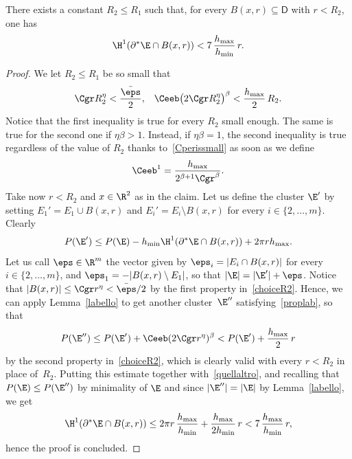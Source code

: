 \begin{lem}\label{13/2}
There exists a constant $R_2\leq R_1$ such that, for every $B(x,r)\subseteq \mathsf{D}$ with $r<R_2$, one has
\begin{equation}\label{step1}
\H^1(\partial^* \E\cap B(x,r)) < 7\,\frac{h_{\max}}{h_{\min}} \, r.
\end{equation}
\end{lem}
\begin{proof}
We let $R_2\leq R_1$ be so small that
\begin{align}\label{choiceR2}
\Cgr R_2^\eta <\frac{\bar\eps} 2, &&
\Ceeb \big( 2 \Cgr R_2^\eta\big)^\beta < \frac{h_{\max}}2\,R_2.
\end{align}
Notice that the first inequality is true for every $R_2$ small enough. The same is true for the second one if $\eta\beta>1$. Instead, if $\eta\beta=1$, the second inequality is true regardless of the value of $R_2$ thanks to~\eqref{Cperissmall} as soon as we define
\begin{equation}\label{ceeb1}
\Ceeb^1 =\frac{h_{\max}}{2^{\beta+1}\Cgr^\beta} .
\end{equation}
Take now $r<R_2$ and $x\in\R^2$ as in the claim. Let us define the cluster $\E'$ by setting $E_1'=E_1\cup B(x,r)$ and $E_i'=E_i\setminus B(x,r)$ for every $i\in\{2,\dots,m\}$. Clearly
\begin{equation}\label{quellaltro}
P(\E')\leq P(\E) - h_{\min} \H^1(\partial^* \E \cap B(x,r)) + 2\pi r h_{\max}.
\end{equation}
Let us call $\eps\in\R^m$ the vector given by $\eps_i=|E_i\cap B(x,r)|$ for every $i\in\{2,\dots,m\}$, and $\eps_1=-|B(x,r)\setminus E_1|$, so that $|\E|=|\E'|+\eps$. Notice that $|B(x,r)|\leq \Cgr r^\eta<\bar\eps/2$ by the first property in~\eqref{choiceR2}. Hence, we can apply Lemma~\ref{labello} to get another cluster~$\E''$ satisfying~\eqref{proplab}, so that
\[
P(\E'') \leq P(\E') + \Ceeb (2\Cgr r^\eta)^\beta < P(\E') + \frac{h_{\max}}2\, r
\]
by the second property in~\eqref{choiceR2}, which is clearly valid with every $r<R_2$ in place of~$R_2$. Putting this estimate together with~\eqref{quellaltro}, and recalling that $P(\E)\leq P(\E'')$ by minimality of $\E$ and since $|\E''|=|\E|$ by Lemma~\ref{labello}, we get
\[
\H^1(\partial^*\E\cap B(x,r))
\leq 2\pi r \,\frac{h_{\max}}{h_{\min}} + \frac{h_{\max}}{2h_{\min}}\,r
<7\,\frac{h_{\max}}{h_{\min}} \, r,
\]
hence the proof is concluded.
\end{proof}

